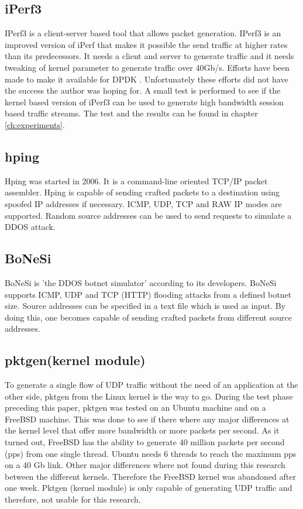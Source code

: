 \subsection{iPerf3}\label{sub:iperf3}
IPerf3 is a client-server based tool that allows packet generation.
IPerf3 is an improved version of iPerf that makes it possible the send traffic at higher rates than its predecessors. It needs a client and server to generate traffic and it needs tweaking of kernel parameter to generate traffic over 40Gb/s. Efforts have been made to make it available for DPDK \cite{jelte}. Unfortunately these efforts did not have the success the author was hoping for. 
A small test is performed to see if the kernel based version of iPerf3 can be used to generate high bandwidth session based traffic streams. The test and the results can be found in chapter \ref{ch:experiments}.

\subsection{hping}\label{sub:hping}
Hping was started in 2006. It is a command-line oriented TCP/IP packet assembler. Hping is capable of sending crafted packets to a destination using spoofed IP addresses if necessary. ICMP, UDP, TCP and RAW IP modes are supported. Random source addresses can be used to send requests to simulate a DDOS attack.    

\subsection{BoNeSi}\label{sub:bonesi}
BoNeSi is 'the DDOS botnet simulator' according to its developers. BoNeSi supports ICMP, UDP and TCP (HTTP) flooding attacks from a defined botnet size. Source addresses can be specified in a text file which is used as input. By doing this, one becomes capable of sending crafted packets from different source addresses.  

\subsection{pktgen(kernel module)}\label{sub:pktgenkernel}
To generate a single flow of UDP traffic without the need of an application at the other side, pktgen from the Linux kernel is the way to go. During the test phase preceding this paper, pktgen was tested on an Ubuntu machine and on a FreeBSD machine. 
This was done to see if there where any major differences at the kernel level that offer more bandwidth or more packets per second. 
As it turned out, FreeBSD has the ability to generate 40 million packets per second (pps) from one single thread. Ubuntu needs 6 threads to reach the maximum pps on a 40 Gb link. 
Other major differences where not found during this research between the different kernels. Therefore the FreeBSD kernel was abandoned after one week. 
Pktgen (kernel module) is only capable of generating UDP traffic and therefore, not usable for this research. 

